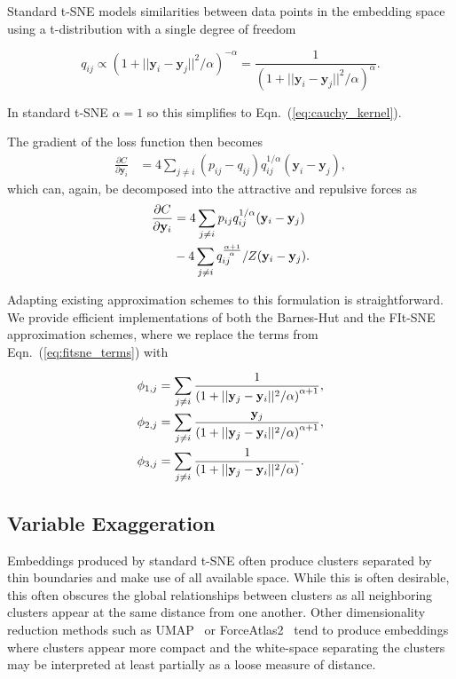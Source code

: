 \documentclass[twocolumn]{bmcart}
\begin{document}
Standard t-SNE models similarities between data points in the embedding space using a t-distribution with a single degree of freedom

\begin{equation}
q_{ij} \propto \left ( 1 + || \mathbf{y}_i - \mathbf{y}_j ||^2 / \alpha \right )^{-\alpha} = \frac{1}{\left( 1 + || \mathbf{y}_i - \mathbf{y}_j ||^2 / \alpha \right)^\alpha }.
\end{equation}

In standard t-SNE $\alpha=1$ so this simplifies to Eqn.~(\ref{eq:cauchy_kernel}).

The gradient of the loss function then becomes
\begin{align}
\frac{\partial C}{\partial \mathbf{y}_i} &= 4 \sum_{j \neq i} \left ( p_{ij} - q_{ij} \right ) q_{ij}^{1/\alpha} \left ( \mathbf{y}_i - \mathbf{y}_j \right ),
\end{align}
which can, again, be decomposed into the attractive and repulsive forces as
\begin{align}
\frac{\partial C}{\partial \mathbf{y}_i} &= 4 \sum_{j \neq i} p_{ij} q_{ij}^{1/\alpha} (\mathbf{y}_i - \mathbf{y}_j) \notag \\
&- 4 \sum_{j \neq i} q_{ij}^{\frac{\alpha+1}{\alpha}} / Z (\mathbf{y}_i - \mathbf{y}_j).
\end{align}

Adapting existing approximation schemes to this formulation is straightforward. We provide efficient implementations of both the Barnes-Hut and the FIt-SNE approximation schemes, where we replace the terms from Eqn.~(\ref{eq:fitsne_terms}) with

\begin{align}
\phi_{1,j} &= \sum_{j \neq i} \frac{1}{\left( 1 + || \mathbf{y}_j - \mathbf{y}_i ||^2 / \alpha \right)^{\alpha+1}}, \notag \\
\phi_{2,j} &= \sum_{j \neq i} \frac{\mathbf{y}_j}{\left( 1 + || \mathbf{y}_j - \mathbf{y}_i ||^2 / \alpha \right)^{\alpha+1}}, \notag \\
\phi_{3,j} &= \sum_{j \neq i} \frac{1}{\left( 1 + || \mathbf{y}_j - \mathbf{y}_i ||^2 / \alpha \right)}. \notag
\end{align}

\subsection*{Variable Exaggeration}

Embeddings produced by standard t-SNE often produce clusters separated by thin boundaries and make use of all available space. While this is often desirable, this often obscures the global relationships between clusters as all neighboring clusters appear at the same distance from one another. Other dimensionality reduction methods such as UMAP~\cite{2018arXivUMAP} or ForceAtlas2~\cite{jacomy2014forceatlas2} tend to produce embeddings where clusters appear more compact and the white-space separating the clusters may be interpreted at least partially as a loose measure of distance.
\end{document}
